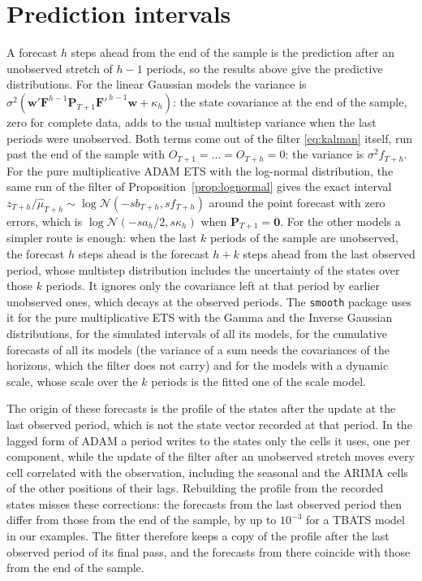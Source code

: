 \documentclass[11pt,a4paper]{article}
\newcommand{\vect}[1]{\mathbf{#1}}
\theoremstyle{remark}
\begin{document}
\section{Prediction intervals}
\label{sec:intervals}

A forecast $h$ steps ahead from the end of the sample is the prediction after an unobserved stretch
of $h-1$ periods, so the results above give the predictive distributions. For the linear Gaussian
models the variance is $\sigma^2(\vect w'\vect F^{h-1}\vect P_{T+1}\vect F'^{\,h-1}\vect w +
\kappa_h)$: the state covariance at the end of the sample, zero for complete data, adds to the usual
multistep variance when the last periods were unobserved. Both terms come out of the filter
\eqref{eq:kalman} itself, run past the end of the sample with $O_{T+1} = \dots = O_{T+h} = 0$: the
variance is $\sigma^2 f_{T+h}$. For the pure multiplicative ADAM ETS with the log-normal
distribution, the same run of the filter of Proposition~\ref{prop:lognormal} gives the exact interval
$z_{T+h}/\hat\mu_{T+h}\sim\log\mathcal N(-s b_{T+h}, s f_{T+h})$ around the point forecast with zero
errors, which is $\log\mathcal N(-s a_h/2, s\kappa_h)$ when $\vect P_{T+1} = \vect 0$. For the
other models a simpler route is enough: when the last $k$ periods of the sample are unobserved, the
forecast $h$ steps ahead is the forecast $h+k$ steps ahead from the last observed period, whose
multistep distribution includes the uncertainty of the states over those $k$ periods. It ignores
only the covariance left at that period by earlier unobserved ones, which decays at the observed
periods. The \texttt{smooth} package uses it for the pure multiplicative ETS with the Gamma and the
Inverse Gaussian distributions, for the simulated intervals of all its models, for the cumulative
forecasts of all its models (the variance of a sum needs the covariances of the horizons, which the
filter does not carry) and for the models with a dynamic scale, whose scale over the $k$ periods is
the fitted one of the scale model.

The origin of these forecasts is the profile of the states after the update at the last observed
period, which is not the state vector recorded at that period. In the lagged form of ADAM a period
writes to the states only the cells it uses, one per component, while the update of the filter after
an unobserved stretch moves every cell correlated with the observation, including the seasonal and
the ARIMA cells of the other positions of their lags. Rebuilding the profile from the recorded states
misses these corrections: the forecasts from the last observed period then differ from those from
the end of the sample, by up to $10^{-3}$ for a TBATS model in our examples. The fitter therefore
keeps a copy of the profile after the last observed period of its final pass, and the forecasts
from there coincide with those from the end of the sample.
\end{document}

